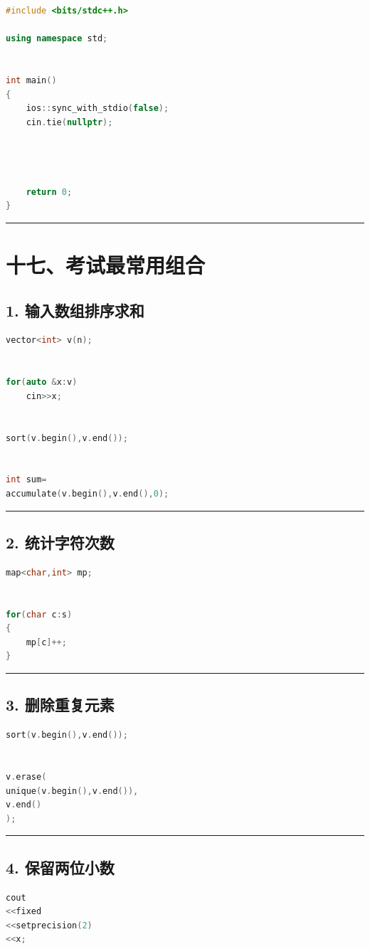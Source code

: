 \documentclass[9pt,twocolumn]{extarticle}
\begin{document}
\begin{lstlisting}[language=C++]
#include <bits/stdc++.h>

using namespace std;


int main()
{
    ios::sync_with_stdio(false);
    cin.tie(nullptr);


    

    return 0;
}
\end{lstlisting}

\noindent\rule{\linewidth}{0.4pt}

\section{十七、考试最常用组合}

\subsection{1. 输入数组排序求和}
\begin{lstlisting}[language=C++]
vector<int> v(n);


for(auto &x:v)
    cin>>x;


sort(v.begin(),v.end());


int sum=
accumulate(v.begin(),v.end(),0);
\end{lstlisting}

\noindent\rule{\linewidth}{0.4pt}

\subsection{2. 统计字符次数}
\begin{lstlisting}[language=C++]
map<char,int> mp;


for(char c:s)
{
    mp[c]++;
}
\end{lstlisting}

\noindent\rule{\linewidth}{0.4pt}

\subsection{3. 删除重复元素}
\begin{lstlisting}[language=C++]
sort(v.begin(),v.end());


v.erase(
unique(v.begin(),v.end()),
v.end()
);
\end{lstlisting}

\noindent\rule{\linewidth}{0.4pt}

\subsection{4. 保留两位小数}
\begin{lstlisting}[language=C++]
cout
<<fixed
<<setprecision(2)
<<x;
\end{lstlisting}
\end{document}
